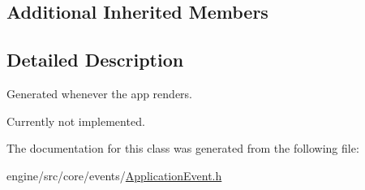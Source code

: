 \subsection*{Additional Inherited Members}


\subsection{Detailed Description}
Generated whenever the app renders. 

Currently not implemented. 

The documentation for this class was generated from the following file\+:\begin{DoxyCompactItemize}
\item 
engine/src/core/events/\hyperlink{ApplicationEvent_8h}{Application\+Event.\+h}\end{DoxyCompactItemize}
